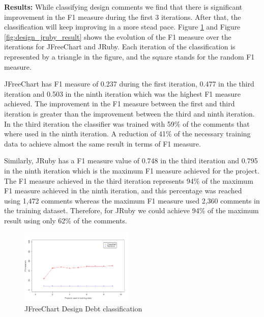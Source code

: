 \vspace{1mm}
\noindent \textbf{Results:} While classifying design \SATD comments we find that there is significant improvement in the F1 measure during the first 3 iterations. After that, the classification will keep improving in a more stead pace. Figure \ref{fig:design_jfreechart_result} and Figure \ref{fig:design_jruby_result} shows the evolution of the F1 measure over the iterations for JFreeChart and JRuby. Each iteration of the classification is represented by a triangle in the figure, and the square stands for the random F1 measure. 

JFreeChart has F1 measure of 0.237 during the first iteration, 0.477 in the third iteration and 0.503 in the ninth iteration which was the highest F1 measure achieved. The improvement in the F1 measure between the first and third iteration is greater than the improvement between the third and ninth iteration. In the third iteration the classifier was trained with 59\% of the comments that where used in the ninth iteration. A reduction of 41\% of the necessary training data to achieve almost the same result in terms of F1 measure. 

Similarly, JRuby has a F1 measure value of 0.748 in the third iteration and 0.795 in the ninth iteration which is the maximum F1 measure achieved for the project. The F1 measure achieved in the third iteration represents 94\% of the maximum F1 measure achieved in the ninth iteration, and this percentage was reached using 1,472 comments whereas the maximum F1 measure used 2,360 comments in the training dataset. Therefore, for JRuby we could achieve 94\% of the maximum result using only 62\% of the comments.


\begin{figure}[thb!]
  \centering
  \includegraphics[width=0.48\textwidth]{figures/design_jfreechart.pdf}
  \vspace{-3mm}
  \caption{JFreeChart Design Debt classification}
  \label{fig:design_jfreechart_result}
\end{figure}

